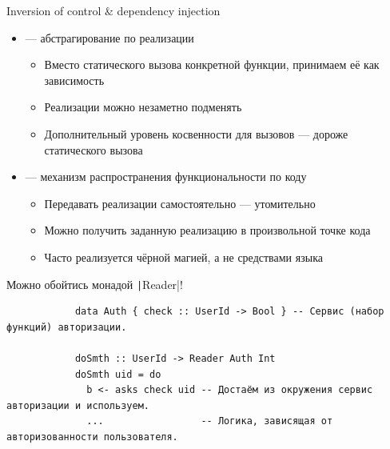     \begin{frame}[fragile]{Inversion of control \& dependency injection \popslide}
        \vspace{-0.5em}
        \begin{itemize}
            \item[\defi]  --- абстрагирование по реализации
            \begin{itemize}
                \item Вместо статического вызова конкретной функции, принимаем её как зависимость
                \item[\positive] Реализации можно незаметно подменять
                \item[\negative] Дополнительный уровень косвенности для вызовов --- дороже статического вызова
            \end{itemize}
            \item[\defi]  --- механизм распространения функциональности по коду
            \begin{itemize}
                \item Передавать реализации самостоятельно --- утомительно
                \item[\positive] Можно получить заданную реализацию в произвольной точке кода
                \item[\negative] Часто реализуется чёрной магией, а не средствами языка
            \end{itemize}
        \end{itemize}
        \pause
        \vspace{0.5em}
        Можно обойтись монадой \texttt|Reader|!
        \begin{verbatim}
            data Auth { check :: UserId -> Bool } -- Сервис (набор функций) авторизации.

            doSmth :: UserId -> Reader Auth Int
            doSmth uid = do
              b <- asks check uid -- Достаём из окружения сервис авторизации и используем.
              ...                 -- Логика, зависящая от авторизованности пользователя.
        \end{verbatim}
    \end{frame}

